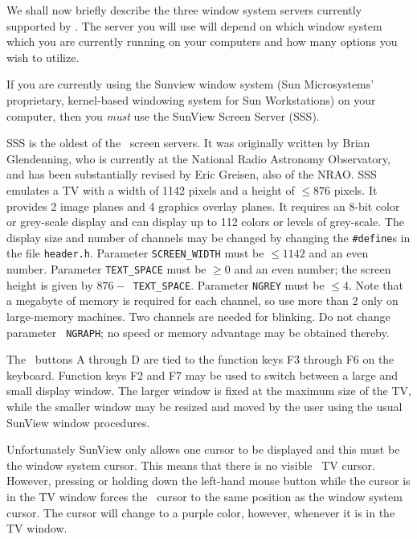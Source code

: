We shall now briefly describe the three window system servers currently
supported by \hbox{\AIPS}. The server you will use will depend on which
window system which you are currently running on your computers and
how many options you wish to utilize.

\eject
{}

If you are currently using the Sunview window system (Sun Microsystems'
proprietary, kernel-based windowing system for Sun Workstations) on
your computer, then you {\it must} use the SunView Screen Server
\hbox{(SSS)}.

SSS is the oldest of the \AIPS\ screen servers.  It was originally
written by Brian Glendenning, who is currently at the National Radio
Astronomy Observatory, and has been substantially revised by Eric
Greisen, also of the \hbox{NRAO}.  SSS emulates a TV with a width of
1142 pixels and a height of $ \le 876$ pixels.  It provides 2 image
planes and 4 graphics overlay planes.  It requires an 8-bit color or
grey-scale display and can display up to 112 colors or levels of
grey-scale.  The display size and number of channels may be changed by
changing the {\tt \#define}s in the file {\tt header.h}.  Parameter
{\tt SCREEN\_WIDTH} must be $\le 1142$ and an even number.  Parameter
{\tt TEXT\_SPACE} must be $\ge 0$ and an even number; the screen height
is given by \hbox{$876 -$ {\tt TEXT\_SPACE}}.  Parameter {\tt NGREY}
must be $\le 4$.  Note that a megabyte of memory is required for each
channel, so use more than 2 only on large-memory machines.  Two
channels are needed for blinking.  Do not change parameter {\tt
NGRAPH}; no speed or memory advantage may be obtained thereby.

The \AIPS\ buttons A through D are tied to the function keys F3 through
F6 on the keyboard.  Function keys F2 and F7 may be used to switch
between a large and small display window.  The larger window is fixed
at the maximum size of the TV, while the smaller window may be resized
and moved by the user using the usual SunView window procedures.

Unfortunately SunView only allows one cursor to be displayed and this
must be the window system cursor.  This means that there is no visible
\AIPS\ TV cursor.  However, pressing or holding down the left-hand
mouse button while the cursor is in the TV window forces the \AIPS\
cursor to the same position as the window system cursor.  The cursor
will change to a purple color, however, whenever it is in the TV window.

